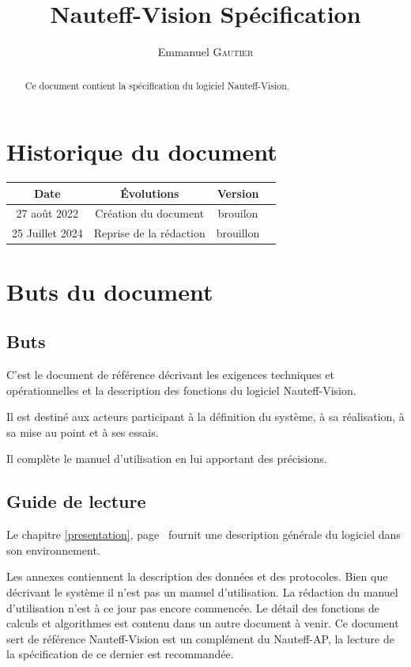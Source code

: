 \documentclass[a4paper,11pt]{report}
\title{Nauteff-Vision Spécification}
\author{Emmanuel \textsc{Gautier}}
\begin{document}
\maketitle

\begin{abstract}
Ce document contient la spécification du logiciel Nauteff-Vision.
\end{abstract}

\chapter*{Historique du document}
\begin{tabular}{|c|c|c|c|}
	\hline 
	Date & Évolutions & Version \\ 
	\hline
	27 août 2022 & Création du document  &  brouilon\\ 
    \hline 
    25 Juillet 2024 &    Reprise de la rédaction &brouillon\\
	\hline
\end{tabular} 
\tableofcontents
\listoftables

\chapter{Buts du document}
\section{Buts}

C'est le document de référence décrivant
les exigences techniques et opérationnelles et la description
des fonctions du logiciel Nauteff-Vision.

Il est destiné aux acteurs participant
à la définition du système, à sa réalisation,
à sa mise au point et à ses essais.

Il complète le manuel d'utilisation en lui apportant des précisions.

\section{Guide de lecture}


Le chapitre \ref{presentation}, page\ \pageref{presentation}
fournit une description générale du logiciel dans son environnement.

Les annexes contiennent la description des données et des protocoles.
Bien que décrivant le système il n'est pas un manuel d'utilisation.
La rédaction du manuel d'utilisation n'est à ce jour pas encore commencée.
Le détail des fonctions de calculs et algorithmes est contenu
dans un autre document à venir.
Ce document sert de référence 
Nauteff-Vision est un complément du Nauteff-AP,
la lecture de la spécification de ce dernier est recommandée.
\end{document}
